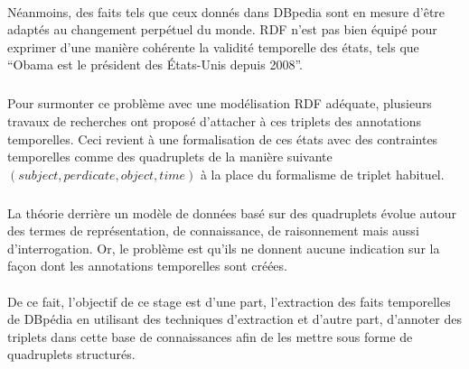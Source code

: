 \paragraph{}
Néanmoins, des faits tels que ceux donnés dans DBpedia sont en mesure d’être adaptés au changement perpétuel du monde.
RDF n’est pas bien équipé pour exprimer d’une manière cohérente la validité temporelle des états, tels que “Obama est le président des États-Unis depuis 2008”. 
\subparagraph{}
Pour surmonter ce problème avec une modélisation RDF adéquate, plusieurs travaux de recherches ont proposé d’attacher à ces triplets des annotations temporelles. Ceci revient à une formalisation de ces états avec des contraintes temporelles comme des quadruplets de la manière suivante $(subject, perdicate, object, time)$ à la place du formalisme de triplet habituel.
\subparagraph{}
La théorie derrière un modèle de données basé sur des quadruplets évolue autour des termes de représentation, de connaissance, de raisonnement mais aussi d’interrogation. Or, le problème est qu’ils ne donnent aucune indication sur la façon dont les annotations temporelles sont créées.
\paragraph{}
De ce fait, l’objectif de ce stage est d’une part, l’extraction des faits temporelles de DBpédia en utilisant des techniques d'extraction et d’autre part, d’annoter des triplets dans cette base de connaissances afin de les mettre sous forme de quadruplets structurés.
